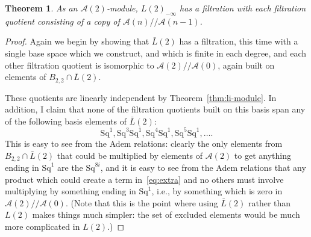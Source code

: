 \documentclass{article}
\newcommand{\A}{\mathcal{A}}
\newcommand{\Sq}{\mathrm{Sq}}
\newcommand{\mmod}{/\!/\!}
\renewcommand{\L}{\bar{L}}
\newcommand{\Lkm}[1][k]{L{(#1)}_{-\infty}}
\newtheorem{thm}{Theorem}
\begin{document}
\begin{thm}
  As an $\A(2)$-module, $\Lkm[2]$ has a filtration with each filtration quotient consisting of a copy of $\A(n)\mmod\A(n-1)$.
\end{thm}
\begin{proof}
  Again we begin by showing that $\L(2)$ has a filtration, this time with a single base space which we construct, and which is finite in each degree, and each other filtration quotient is isomorphic to $\A(2)\mmod\A(0)$, again built on elements of $B_{2,2}\cap \L(2)$.

  These quotients are linearly independent by Theorem~\ref{thm:li-module}.  In addition, I claim that none of the filtration quotients built on this basis span any of the following basis elements of $\L(2)$:
\begin{equation} \Sq^1, \Sq^3\Sq^1, \Sq^4\Sq^1, \Sq^5\Sq^1, \ldots. \label{eq:extra}\end{equation}
  This is easy to see from the Adem relations: clearly the only elements from $B_{2,2}\cap \L(2)$ that could be multiplied by elements of $\A(2)$ to get anything ending in $\Sq^1$ are the $\Sq^{8i}$, and it is easy to see from the Adem relations that any product which could create a term in~\eqref{eq:extra} and no others must involve multiplying by something ending in $\Sq^1$, i.e., by something which is zero in $\A(2)\mmod\A(0)$.  (Note that this is the point where using $\L(2)$ rather than $L(2)$ makes things much simpler: the set of excluded elements would be much more complicated in $L(2)$.)


\end{proof}
\end{document}
